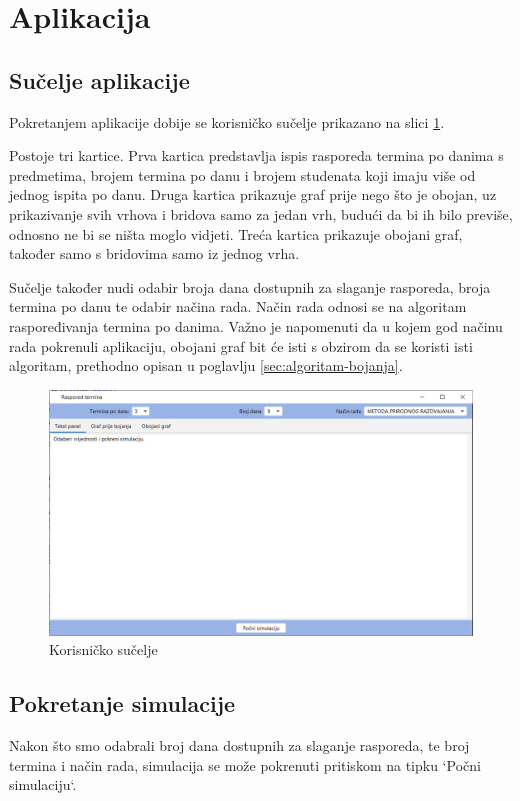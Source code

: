 \documentclass[times, utf8, zavrsni, numeric]{fer}
\begin{document}
\newpage
\section{Aplikacija}
\subsection*{Sučelje aplikacije}
\par Pokretanjem aplikacije dobije se korisničko sučelje prikazano na slici \ref{fig:korisnicko-sucelje}.\par 
Postoje tri kartice. Prva kartica predstavlja ispis rasporeda termina po danima s predmetima, brojem termina po danu i brojem studenata koji imaju više od jednog ispita po danu. Druga kartica prikazuje graf prije nego što je obojan, uz prikazivanje svih vrhova i bridova samo za jedan vrh, budući da bi ih bilo previše, odnosno ne bi se ništa moglo vidjeti. Treća kartica prikazuje obojani graf, također samo s bridovima samo iz jednog vrha.\par
Sučelje također nudi odabir broja dana dostupnih za slaganje rasporeda, broja termina po danu te odabir načina rada. Način rada odnosi se na algoritam raspoređivanja termina po danima. Važno je napomenuti da u kojem god načinu rada pokrenuli aplikaciju, obojani graf bit će isti s obzirom da se koristi isti algoritam, prethodno opisan u poglavlju \ref{sec:algoritam-bojanja}.
\begin{figure}[h]
	\centering
	\includegraphics[width=0.9\columnwidth]{slike/aplikacija.png}
	\caption{Korisničko sučelje}
	\label{fig:korisnicko-sucelje}
\end{figure}

\subsection*{Pokretanje simulacije}
Nakon što smo odabrali broj dana dostupnih za slaganje rasporeda, te broj termina i način rada, simulacija se može pokrenuti pritiskom na tipku `Počni simulaciju`.\\
\end{document}
